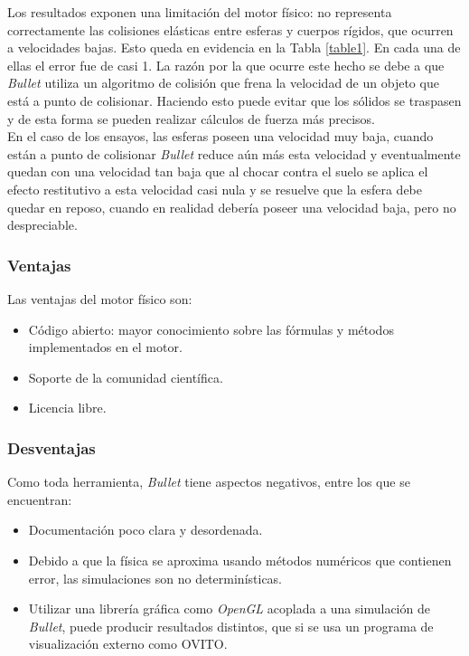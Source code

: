 \documentclass{article}
\begin{document}
\noindent Los resultados exponen una limitaci\'on del motor f\'isico: no representa correctamente las colisiones el\'asticas entre esferas y cuerpos r\'igidos, que ocurren a velocidades bajas. Esto queda en evidencia en la Tabla \ref{table1}. En cada una de ellas el error fue de casi 1. La raz\'on por la que ocurre este hecho se debe a que \textit{Bullet} utiliza un algoritmo de colisi\'on que frena la velocidad de un objeto que est\'a a punto de colisionar. Haciendo esto puede evitar que los s\'olidos se traspasen y de esta forma se pueden realizar c\'alculos de fuerza m\'as precisos. \\
En el caso de los ensayos, las esferas poseen una velocidad muy baja, cuando est\'an a punto de colisionar \textit{Bullet} reduce a\'un m\'as esta velocidad y eventualmente quedan con una velocidad tan baja que al chocar contra el suelo se aplica el efecto restitutivo a esta velocidad casi nula y se resuelve que la esfera debe quedar en reposo, cuando en realidad deber\'ia poseer una velocidad baja, pero no despreciable.


\subsubsection{Ventajas}
Las ventajas del motor f\'isico son:
\begin{itemize}[leftmargin=5.5mm]
\item C\'odigo abierto: mayor conocimiento sobre las f\'ormulas y m\'etodos implementados en el motor.
\item Soporte de la comunidad cient\'ifica.
\item Licencia libre.
\end{itemize}


\subsubsection{Desventajas}
Como toda herramienta, \textit{Bullet} tiene aspectos negativos, entre los que se encuentran: 
\begin{itemize}[leftmargin=5.5mm]
\item Documentaci\'on poco clara y desordenada.
\item Debido a que la f\'isica se aproxima usando m\'etodos num\'ericos que contienen error, las simulaciones son no determin\'isticas.
\item Utilizar una librer\'ia gr\'afica como \textit{OpenGL} acoplada a una simulaci\'on  de \textit{Bullet}, puede producir resultados distintos, que si se usa un programa de visualizaci\'on externo como OVITO.
\end{itemize}
\end{document}
